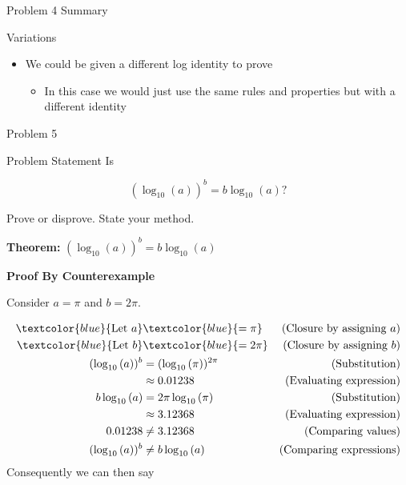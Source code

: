 \begin{summary}{Problem 4 Summary}
    \begin{statement}{Variations}
        \begin{itemize}
            \item We could be given a different log identity to prove
            \begin{itemize}
                \item In this case we would just use the same rules and properties but with a different identity
            \end{itemize}
        \end{itemize}
    \end{statement}
\end{summary}

\begin{problem}{Problem 5}
    \begin{statement}{Problem Statement}
        Is 

        \begin{equation*}
            (\log_{10}(a))^{b} = b \log_{10}{(a)}?
        \end{equation*}

        Prove or disprove. State your method.
    \end{statement}

    \begin{highlight}[Solution]
        \textbf{Theorem:} $(\log_{10}(a))^{b} = b \log_{10}{(a)}$ \vspace*{1em}

        \textbf{Proof By Counterexample} \vspace*{1em}

        Consider $a = \pi$ and $b = 2\pi$.

        \begin{align*}
            \textcolor{blue}{\text{Let } a } & \textcolor{blue}{ = \pi} & \text{(Closure by assigning $a$)} \\
            \textcolor{blue}{\text{Let } b } & \textcolor{blue}{ = 2\pi} & \text{(Closure by assigning $b$)} \\
            (\log_{10}{(a)})^{b} & = (\log_{10}{(\pi)})^{2\pi} & \text{(Substitution)} \\
            & \approx 0.01238 & \text{(Evaluating expression)} \\
            b\log_{10}{(a)} & = 2\pi\log_{10}{(\pi)} & \text{(Substitution)} \\
            & \approx 3.12368 & \text{(Evaluating expression)} \\
            0.01238 & \neq 3.12368 & \text{(Comparing values)} \\
            (\log_{10}{(a)})^{b} & \neq b\log_{10}{(a)} & \text{(Comparing expressions)}
        \end{align*}
        Consequently we can then say 


\end{highlight}
\end{problem}
